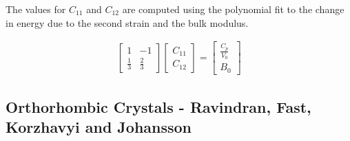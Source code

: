 The values for $C_{11}$ and $C_{12}$ are computed using the polynomial fit to the change in energy due to the second strain and the bulk modulus.

\begin{equation}
\begin{split}
	\begin{bmatrix} 1 & -1 \\ \frac{1}{3} & \frac{2}{3} \end{bmatrix} \begin{bmatrix} C_{11} \\ C_{12} \end{bmatrix} = \begin{bmatrix} \frac{C_{p}}{V_0} \\ B_0 \end{bmatrix}
\end{split}
\label{eq:eqC11C12elastic}
\end{equation}


\subsection{Orthorhombic Crystals - Ravindran, Fast, Korzhavyi and Johansson}

